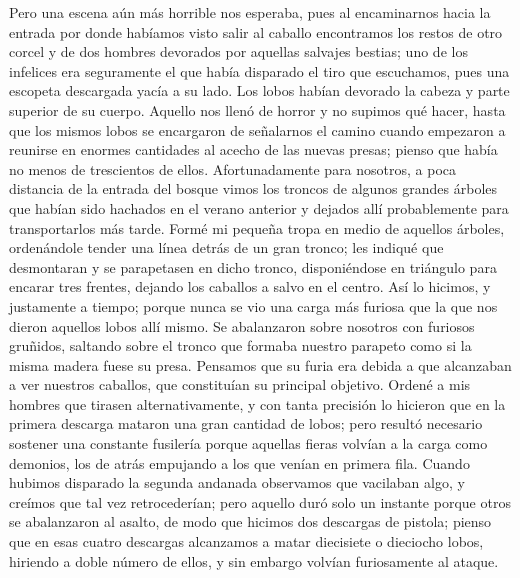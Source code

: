 \documentclass{novela}
\begin{document}
    Pero una escena aún más horrible nos esperaba, pues al encaminarnos hacia la entrada por donde habíamos visto salir al caballo encontramos los restos de otro corcel y de dos hombres devorados por aquellas salvajes bestias; uno de los infelices era seguramente el que había disparado el tiro que escuchamos, pues una escopeta descargada yacía a su lado. Los lobos habían devorado la cabeza y parte superior de su cuerpo.
    Aquello nos llenó de horror y no supimos qué hacer, hasta que los mismos lobos se encargaron de señalarnos el camino cuando empezaron a reunirse en enormes cantidades al acecho de las nuevas presas; pienso que había no menos de trescientos de ellos. Afortunadamente para nosotros, a poca distancia de la entrada del bosque vimos los troncos de algunos grandes árboles que habían sido hachados en el verano anterior y dejados allí probablemente para transportarlos más tarde.
    Formé mi pequeña tropa en medio de aquellos árboles, ordenándole tender una línea detrás de un gran tronco; les indiqué que desmontaran y se parapetasen en dicho tronco, disponiéndose en triángulo para encarar tres frentes, dejando los caballos a salvo en el centro.
    Así lo hicimos, y justamente a tiempo; porque nunca se vio una carga más furiosa que la que nos dieron aquellos lobos allí mismo. Se abalanzaron sobre nosotros con furiosos gruñidos, saltando sobre el tronco que formaba nuestro parapeto como si la misma madera fuese su presa. Pensamos que su furia era debida a que alcanzaban a ver nuestros caballos, que constituían su principal objetivo. Ordené a mis hombres que tirasen alternativamente, y con tanta precisión lo hicieron que en la primera descarga mataron una gran cantidad de lobos; pero resultó necesario sostener una constante fusilería porque aquellas fieras volvían a la carga como demonios, los de atrás empujando a los que venían en primera fila.
    Cuando hubimos disparado la segunda andanada observamos que vacilaban algo, y creímos que tal vez retrocederían; pero aquello duró solo un instante porque otros se abalanzaron al asalto, de modo que hicimos dos descargas de pistola; pienso que en esas cuatro descargas alcanzamos a matar diecisiete o dieciocho lobos, hiriendo a doble número de ellos, y sin embargo volvían furiosamente al ataque.
\end{document}
